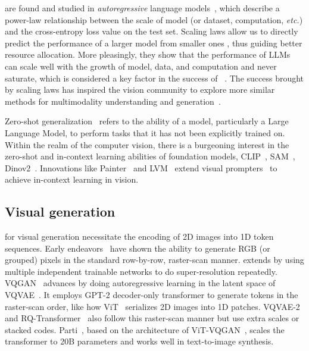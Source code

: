  are found and studied in \textit{autoregressive} language models~\cite{scalinglaw,scalingar}, which describe a power-law relationship between the scale of model (or dataset, computation, \textit{etc.}) and the cross-entropy loss value on the test set.
Scaling laws allow us to directly predict the performance of a larger model from smaller ones \cite{gpt4}, thus guiding better resource allocation.
More pleasingly, they show that the performance of LLMs can scale well with the growth of model, data, and computation and never saturate, which is considered a key factor in the success of ~\cite{gpt3, llama1, llama2, opt, bloom, chinchilla}.
The success brought by scaling laws has inspired the vision community to explore more similar methods for multimodality understanding and generation~\cite{llava,alayrac2022flamingo,visionllm,dong2023dreamllm,cm3leon_chameleon,emu_baai,chen2023internvl,dai2023emu_meta,jin2023unified,ge2023seed_llama,ge2024seedx,tian2024mminterleaved,wang2024git}.

 Zero-shot generalization~\cite{multitask_zeroshot} refers to the ability of a model, particularly a Large Language Model, to perform tasks that it has not been explicitly trained on.
Within the realm of the computer vision, there is a burgeoning interest in the zero-shot and in-context learning abilities of foundation models, CLIP~\cite{clip}, SAM~\cite{sam}, Dinov2~\cite{dinov2}. Innovations like Painter~\cite{painter} and LVM~\cite{lvm} extend visual prompters~\cite{visualprompttuning1,visualprompttuning2} to achieve in-context learning in vision.

\vspace{-3pt}
\subsection{Visual generation}
\vspace{-3pt}
 for visual generation necessitate the encoding of 2D images into 1D token sequences.
Early endeavors~\cite{igpt,van2016pixelcnn} have shown the ability to generate RGB (or grouped) pixels in the standard row-by-row, raster-scan manner.
\cite{reed2017mspixelcnn} extends \cite{van2016pixelcnn} by using multiple independent trainable networks to do super-resolution repeatedly.
VQGAN~\cite{vqgan} advances \cite{igpt,van2016pixelcnn} by doing autoregressive learning in the latent space of VQVAE~\cite{vqvae}.
It employs GPT-2 decoder-only transformer to generate tokens in the raster-scan order, like how ViT~\cite{vit} serializes 2D images into 1D patches.
VQVAE-2~\cite{vqvae2} and RQ-Transformer~\cite{rq} also follow this raster-scan manner but use extra scales or stacked codes.
Parti~\cite{parti}, based on the architecture of ViT-VQGAN~\cite{vit-vqgan}, scales the transformer to 20B parameters and works well in text-to-image synthesis.

